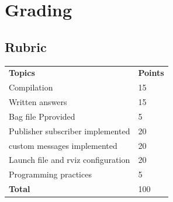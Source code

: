 \documentclass[letta4 paper]{article}
\numberwithin{equation}{section}
\newcommand{\0}{\mathbf{0}}
\begin{document}
	\section{Grading}
	
	\subsection{Rubric}
	\begin{table}[h]
		\begin{tabular}{ll}
			\textbf{Topics} & \textbf{Points} \\
			Compilation &	15 \\
			Written answers &	15 \\
			Bag file Pprovided &	5 \\
			Publisher subscriber implemented &	20 \\
			custom messages implemented &	20 \\
			Launch file and rviz configuration &	20 \\
			Programming practices &	5 \\
			\textbf{Total} & 100 \\
		\end{tabular}
	\end{table}
	

	
			
\end{document}
